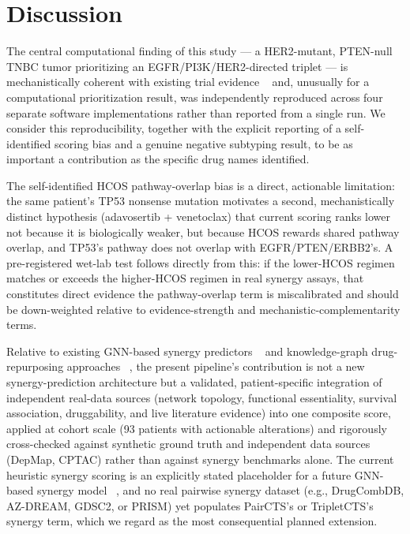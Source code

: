 \documentclass[10pt,letterpaper]{article}
\begin{document}
\section*{Discussion}

The central computational finding of this study --- a HER2-mutant, PTEN-null TNBC tumor prioritizing an EGFR/PI3K/HER2-directed triplet --- is mechanistically coherent with existing trial evidence ~\cite{bib8} and, unusually for a computational prioritization result, was independently reproduced across four separate software implementations rather than reported from a single run. We consider this reproducibility, together with the explicit reporting of a self-identified scoring bias and a genuine negative subtyping result, to be as important a contribution as the specific drug names identified.

The self-identified HCOS pathway-overlap bias is a direct, actionable limitation: the same patient's TP53 nonsense mutation motivates a second, mechanistically distinct hypothesis (adavosertib + venetoclax) that current scoring ranks lower not because it is biologically weaker, but because HCOS rewards shared pathway overlap, and TP53's pathway does not overlap with EGFR/PTEN/ERBB2's. A pre-registered wet-lab test follows directly from this: if the lower-HCOS regimen matches or exceeds the higher-HCOS regimen in real synergy assays, that constitutes direct evidence the pathway-overlap term is miscalibrated and should be down-weighted relative to evidence-strength and mechanistic-complementarity terms.

Relative to existing GNN-based synergy predictors ~\cite{bib3,bib4,bib5} and knowledge-graph drug-repurposing approaches ~\cite{bib6,bib7}, the present pipeline's contribution is not a new synergy-prediction architecture but a validated, patient-specific integration of independent real-data sources (network topology, functional essentiality, survival association, druggability, and live literature evidence) into one composite score, applied at cohort scale (93 patients with actionable alterations) and rigorously cross-checked against synthetic ground truth and independent data sources (DepMap, CPTAC) rather than against synergy benchmarks alone. The current heuristic synergy scoring is an explicitly stated placeholder for a future GNN-based synergy model ~\cite{bib3,bib4}, and no real pairwise synergy dataset (e.g., DrugCombDB, AZ-DREAM, GDSC2, or PRISM) yet populates PairCTS's or TripletCTS's synergy term, which we regard as the most consequential planned extension.
\end{document}
